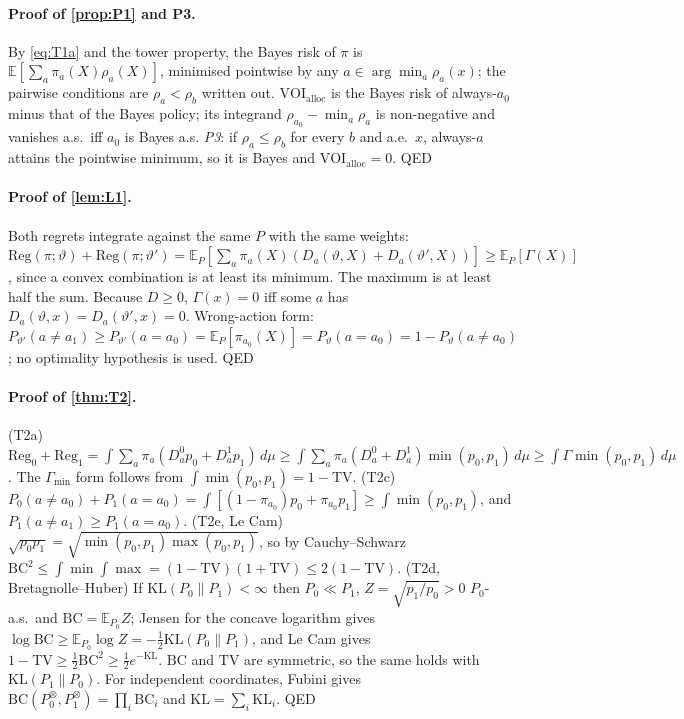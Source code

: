 \documentclass[10pt,twocolumn]{article}
\theoremstyle{definition}
\theoremstyle{remark}
\renewcommand{\qedsymbol}{{\normalfont\small QED}}
\newcommand{\E}{\mathbb{E}}
\newcommand{\vt}{\vartheta}
\newcommand{\TV}{\mathrm{TV}}
\newcommand{\KL}{\mathrm{KL}}
\newcommand{\BC}{\mathrm{BC}}
\newcommand{\Reg}{\mathrm{Reg}}
\begin{document}
\paragraph{Proof of \cref{prop:P1} and P3.} By \eqref{eq:T1a} and the tower property, the Bayes risk of $\pi$ is $\E[\sum_a\pi_a(X)\rho_a(X)]$, minimised pointwise by any $a\in\arg\min_a\rho_a(x)$; the pairwise conditions are $\rho_a<\rho_b$ written out. $\mathrm{VOI}_{\mathrm{alloc}}$ is the Bayes risk of always-$a_0$ minus that of the Bayes policy; its integrand $\rho_{a_0}-\min_a\rho_a$ is non-negative and vanishes a.s.\ iff $a_0$ is Bayes a.s. \emph{P3}: if $\rho_a\le\rho_b$ for every $b$ and a.e.\ $x$, always-$a$ attains the pointwise minimum, so it is Bayes and $\mathrm{VOI}_{\mathrm{alloc}}=0$. \hfill\qedsymbol

\paragraph{Proof of \cref{lem:L1}.} Both regrets integrate against the same $P$ with the same weights:
$\Reg(\pi;\vt)+\Reg(\pi;\vt')=\E_P[\sum_a\pi_a(X)(D_a(\vt,X)+D_a(\vt',X))]\ge\E_P[\Gamma(X)]$, since a convex combination is at least its minimum. The maximum is at least half the sum. Because $D\ge0$, $\Gamma(x)=0$ iff some $a$ has $D_a(\vt,x)=D_a(\vt',x)=0$. Wrong-action form: $P_{\vt'}(a\neq a_1)\ge P_{\vt'}(a=a_0)=\E_P[\pi_{a_0}(X)]=P_\vt(a=a_0)=1-P_\vt(a\neq a_0)$; no optimality hypothesis is used. \hfill\qedsymbol

\paragraph{Proof of \cref{thm:T2}.} (T2a) $\Reg_0+\Reg_1=\int\sum_a\pi_a(D^0_ap_0+D^1_ap_1)\,d\mu\ge\int\sum_a\pi_a(D^0_a+D^1_a)\min(p_0,p_1)\,d\mu\ge\int\Gamma\min(p_0,p_1)\,d\mu$. The $\Gamma_{\min}$ form follows from $\int\min(p_0,p_1)=1-\TV$. (T2c) $P_0(a\neq a_0)+P_1(a=a_0)=\int[(1-\pi_{a_0})p_0+\pi_{a_0}p_1]\ge\int\min(p_0,p_1)$, and $P_1(a\neq a_1)\ge P_1(a=a_0)$. (T2e, Le Cam) $\sqrt{p_0p_1}=\sqrt{\min(p_0,p_1)\max(p_0,p_1)}$, so by Cauchy--Schwarz $\BC^2\le\int\min\int\max=(1-\TV)(1+\TV)\le2(1-\TV)$. (T2d, Bretagnolle--Huber) If $\KL(P_0\|P_1)<\infty$ then $P_0\ll P_1$, $Z=\sqrt{p_1/p_0}>0$ $P_0$-a.s.\ and $\BC=\E_{P_0}Z$; Jensen for the concave logarithm gives $\log\BC\ge\E_{P_0}\log Z=-\tfrac12\KL(P_0\|P_1)$, and Le Cam gives $1-\TV\ge\tfrac12\BC^2\ge\tfrac12e^{-\KL}$. $\BC$ and $\TV$ are symmetric, so the same holds with $\KL(P_1\|P_0)$. For independent coordinates, Fubini gives $\BC(P_0^{\otimes},P_1^{\otimes})=\prod_i\BC_i$ and $\KL=\sum_i\KL_i$. \hfill\qedsymbol
\end{document}

